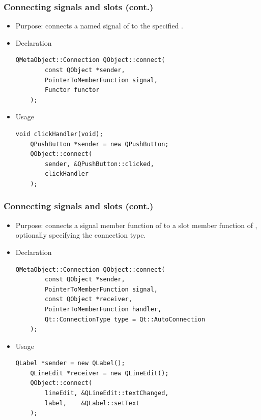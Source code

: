 \begin{frame}[fragile]
  \frametitle{Connecting signals and slots (cont.)}
   \begin{itemize}
      \item Purpose: connects a named signal of \verb@sender@ to the specified
        \verb@functor@.
      \item Declaration
      \begin{lstlisting}[basicstyle=\scriptsize\ttfamily]
	QMetaObject::Connection QObject::connect(
	    const QObject *sender,
	    PointerToMemberFunction signal,
	    Functor functor
	);
      \end{lstlisting}
      \item Usage
      \begin{lstlisting}[basicstyle=\scriptsize\ttfamily]
	void clickHandler(void);
	QPushButton *sender = new QPushButton;
	QObject::connect(
	    sender, &QPushButton::clicked,
	    clickHandler
	);
      \end{lstlisting}
    \end{itemize}
\end{frame}

\begin{frame}[fragile]
  \frametitle{Connecting signals and slots (cont.)}
   \begin{itemize}
      \item Purpose: connects a signal member function of \verb@sender@ to
        a slot member function of \verb@receiver@, optionally specifying the
        connection type.
      \item Declaration
      \begin{lstlisting}[basicstyle=\scriptsize\ttfamily]
	QMetaObject::Connection QObject::connect(
	    const QObject *sender,
	    PointerToMemberFunction signal,
	    const QObject *receiver,
	    PointerToMemberFunction handler,
	    Qt::ConnectionType type = Qt::AutoConnection
	);
      \end{lstlisting}
      \item Usage
      \begin{lstlisting}[basicstyle=\scriptsize\ttfamily]
	QLabel *sender = new QLabel();
	QLineEdit *receiver = new QLineEdit();
	QObject::connect(
	    lineEdit, &QLineEdit::textChanged,
	    label,    &QLabel::setText
	);
      \end{lstlisting}
    \end{itemize}
\end{frame}

